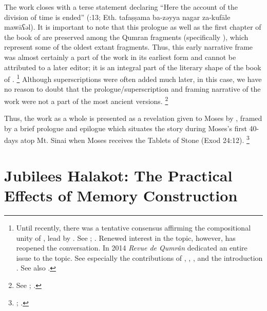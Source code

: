 %
\noindent
The work closes with a terse statement declaring ``Here the account of the division of time is ended'' (:13; Eth. 
        {tafaṣṣama ba-zəyya nagar za-kufāle mawāʕəl}).
\noindent
It is important to note that this prologue as well as the first chapter of the book of \jub are preserved among the Qumran fragments (specifically ), which represent some of the oldest extant \jub fragments. Thus, this early narrative frame was almost certainly a part of the work in its earliest form and cannot be attributed to a later editor; it is an integral part of the literary shape of the book of \jub.%
    \footnote{%
        Until recently, there was a tentative consensus affirming the compositional unity of \jub, lead by \vanderkam. See \cite{vanderkam_lidonnici-lieber2007}; \cite{vanderkam_cbr2008}. Renewed interest in the topic, however, has reopened the conversation. In 2014 \emph{Revue de Qumrân} dedicated an entire issue to the topic. See especially the contributions of 
            \cite{vanderkam_rev-qumran2014},
            \cite{kugel_rev-qumran2014},
            \cite{tigchelaar_rev-qumran2014}, and the introduction
            \cite{najman-tigchelaar_rev-qumran2014}. See also 
            \cite{monger_jsp2017}.}
Although superscriptions were often added much later, in this case, we have no reason to doubt that the prologue/superscription and framing narrative of the work were not a part of the most ancient versions.%
        \footnote{%
            See 
            \cite[1:125]{vanderkam2018};
            \cite[25]{vanderkam_metso-etal2010}.}

Thus, the work as a whole is presented as a revelation given to Moses by \yahweh, framed by a brief prologue and epilogue which situates the story during Moses's first 40-days atop Mt. Sinai when Moses receives the Tablets of Stone (Exod 24:12).%
    \footnote{%
        \Cite[1:129]{vanderkam2018};
        \cite{vanderkam_vanderkam2000}.}


\section{Jubilees Halakot: The Practical Effects of Memory Construction}

